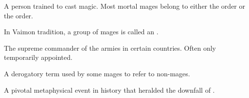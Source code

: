 \begin{gloss}
\begin{comment}
\paragraph{The Light}
\end{comment}
\seee{\iquin}







\begin{comment}
\paragraph{mage}
\end{comment}
A person trained to cast magic. 
Most mortal mages belong to either the  order or the  order. 

In Vaimon tradition, a group of mages is called an . 







\begin{comment}
\paragraph{Marshal}
\end{comment}
The supreme commander of the armies in certain \Velcadian{} countries. 
Often only temporarily appointed. 







\begin{comment}
\paragraph{mundane}
\end{comment}
A derogatory term used by some mages to refer to non-mages.







\begin{comment}
\paragraph{Murder of the Dawn}
\end{comment}
A pivotal metaphysical event in \resphan{} history that heralded the downfall of \Merkyrah. 








\end{gloss}
